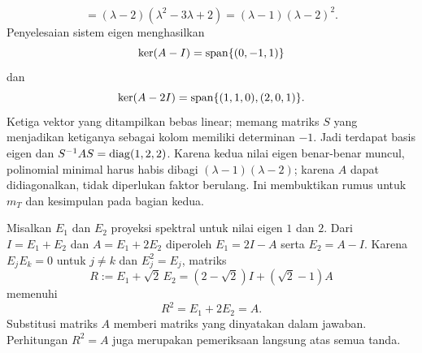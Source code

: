 \begin{o001solution}
\begin{o001proof}
\[ =(\lambda-2)(\lambda^2-3\lambda+2)
 =(\lambda-1)(\lambda-2)^2.
\]
Penyelesaian sistem eigen menghasilkan
\[
\ker(A-I)=\operatorname{span}\{(0,-1,1)\}
\]
dan
\[
\ker(A-2I)=\operatorname{span}\{(1,1,0),(2,0,1)\}.
\]
Ketiga vektor yang ditampilkan bebas linear; memang matriks $S$ yang
menjadikan ketiganya sebagai kolom memiliki determinan $-1$. Jadi terdapat
basis eigen dan
$S^{-1}AS=\operatorname{diag}(1,2,2)$. Karena kedua nilai eigen benar-benar muncul,
polinomial minimal harus habis dibagi $(\lambda-1)(\lambda-2)$; karena $A$
dapat didiagonalkan, tidak diperlukan faktor berulang. Ini membuktikan rumus
untuk $m_T$ dan kesimpulan pada bagian kedua.

Misalkan $E_1$ dan $E_2$ proyeksi spektral untuk nilai eigen $1$ dan $2$.
Dari $I=E_1+E_2$ dan $A=E_1+2E_2$ diperoleh
$E_1=2I-A$ serta $E_2=A-I$. Karena $E_jE_k=0$ untuk $j\ne k$ dan
$E_j^2=E_j$, matriks
\[
 R:=E_1+\sqrt2\,E_2=(2-\sqrt2)I+(\sqrt2-1)A
\]
memenuhi
\[
 R^2=E_1+2E_2=A.
\]
Substitusi matriks $A$ memberi matriks yang dinyatakan dalam jawaban.
Perhitungan $R^2=A$ juga merupakan pemeriksaan langsung atas semua tanda.
\end{o001proof}
\end{o001solution}

